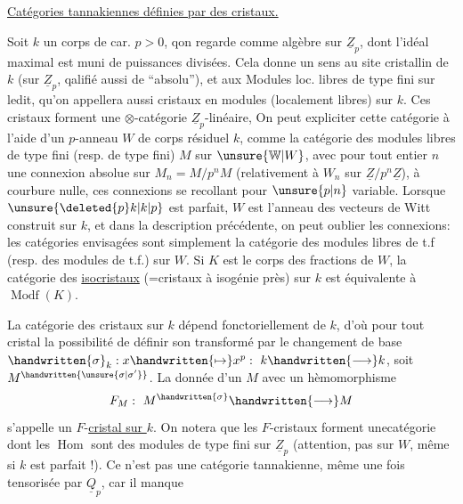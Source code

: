 \uline{Catégories tannakiennes définies par des cristaux.}

 Soit $k$ un corps de car. $p>0$, qon regarde comme algèbre sur $\underline{Z}_p$, dont l'idéal maximal est muni de puissances divisées. Cela donne un sens au site cristallin de $k$ (sur $\underline{Z}_p$, qalifié aussi de ``absolu''), et aux Modules loc. libres de type fini sur ledit, qu'on appellera aussi cristaux en modules (localement libres) sur $k$. Ces cristaux forment une $\otimes$-catégorie $\underline{Z}_p$-linéaire,  On peut expliciter cette catégorie à l'aide d'un $p$-anneau $W$ de corps résiduel $k$, comme la catégorie des modules libres de type fini (resp. de type fini) $M$ sur $\unsure{\mathbb{W}|W}$, avec pour tout entier $n$ une connexion absolue sur $M_n=M/p^nM$ (relativement à $W_n$ sur $\underline{Z}/p^n\underline{Z}$), à courbure nulle, ces connexions se recollant pour $\unsure{p|n}$ variable. Lorsque $\unsure{\deleted{p}k|k|p}$ est parfait, $W$ est l'anneau des vecteurs de Witt construit sur $k$, et dans la description précédente, on peut oublier les connexions: les catégories envisagées sont simplement la catégorie des modules libres de t.f (resp. des modules de t.f.) sur $W$. Si $K$ est le corps des fractions de $W$, la catégorie des \uline{isocristaux}  (=cristaux à isogénie près) sur $k$ est équivalente à $\operatorname{Modf}(K)$. 

 La catégorie des cristaux sur $k$ dépend fonctoriellement de $k$, d'où pour tout cristal la possibilité de définir son transformé par le changement de base $\handwritten{\sigma}_k:x\handwritten{\mapsto}x^p:\ k\handwritten{\longrightarrow}k$, soit $M^{\handwritten{\unsure{\sigma|\sigma'}}}$. La donnée d'un $M$ avec un hèmomorphisme
\[
F_M:\ M^{\handwritten{\sigma}}\handwritten{\longrightarrow}M
\]
s'appelle un $F$\handwritten{\unsure{(}}-\uline{cristal sur $k$}. On notera que les $F$-cristaux forment une\inserted{$\otimes$-}catégorie dont les $\operatorname{Hom}$ sont des modules de type fini sur $\underline{Z}_p$ (attention, pas sur $W$, même si $k$ est parfait !). Ce n'est pas une  catégorie tannakienne, même une fois tensorisée par $\underline{Q}_p$, car il manque

